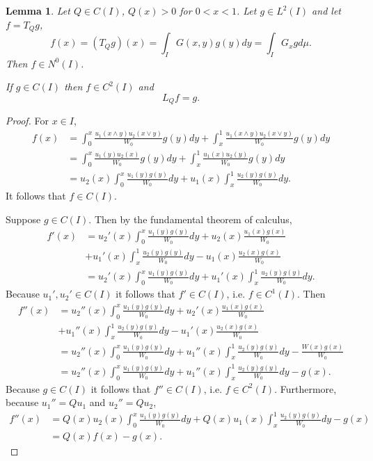 \documentclass{article}
\newtheorem{lemma}[theorem]{Lemma}
\theoremstyle{definition}
\begin{document}
\begin{lemma}
Let $Q \in C(I)$, $Q(x)>0$ for $0<x<1$. 
Let $g \in L^2(I)$ and let $f=T_Qg$,
\[
f(x)=(T_Qg)(x)=\int_I G(x,y) g(y) dy
=\int_I G_x g d\mu.
\]
Then $f \in N^0(I)$.  

If $g \in C(I)$ then $f \in C^2(I)$ and
\[
L_Q f=g.
\]
\label{proposition328}
\end{lemma}
\begin{proof}
For $x \in I$,
\begin{align*}
f(x)&=\int_0^x  \frac{u_1(x \wedge y) u_2(x \vee y)}{W_0} g(y) dy
+\int_x^1  \frac{u_1(x \wedge y) u_2(x \vee y)}{W_0} g(y) dy\\
&=\int_0^x \frac{u_1(y)u_2(x)}{W_0} g(y) dy
+\int_x^1 \frac{u_1(x)u_2(y)}{W_0}g(y) dy\\
&=u_2(x)\int_0^x \frac{u_1(y)g(y)}{W_0} dy
+u_1(x) \int_x^1 \frac{u_2(y) g(y)}{W_0} dy.
\end{align*}
It follows that $f \in C(I)$.

Suppose $g \in C(I)$. Then by the fundamental theorem of calculus,
\begin{align*}
f'(x)&=u_2'(x)\int_0^x \frac{u_1(y)g(y)}{W_0} dy
+u_2(x) \frac{u_1(x) g(x)}{W_0}\\
&+u_1'(x) \int_x^1 \frac{u_2(y) g(y)}{W_0} dy
-u_1(x) \frac{u_2(x)g(x)}{W_0}\\
&=u_2'(x)\int_0^x \frac{u_1(y)g(y)}{W_0} dy+u_1'(x) \int_x^1 \frac{u_2(y) g(y)}{W_0} dy.
\end{align*}
Because $u_1',u_2' \in C(I)$ it follows that $f' \in C(I)$, i.e. $f \in C^1(I)$.
Then
\begin{align*}
f''(x)&=u_2''(x)\int_0^x \frac{u_1(y)g(y)}{W_0} dy+u_2'(x) \frac{u_1(x)g(x)}{W_0}\\
&+u_1''(x)\int_x^1  \frac{u_2(y) g(y)}{W_0} dy
-u_1'(x) \frac{u_2(x)g(x)}{W_0}\\
&=u_2''(x)\int_0^x \frac{u_1(y)g(y)}{W_0} dy+u_1''(x)\int_x^1  \frac{u_2(y) g(y)}{W_0} dy-\frac{W(x)g(x)}{W_0}\\
&=u_2''(x)\int_0^x \frac{u_1(y)g(y)}{W_0} dy+u_1''(x)\int_x^1  \frac{u_2(y) g(y)}{W_0} dy-g(x).
\end{align*}
Because $g \in C(I)$ it follows that $f'' \in C(I)$, i.e. $f \in C^2(I)$. Furthermore,
because $u_1''=Qu_1$ and $u_2''=Qu_2$,
\begin{align*}
f''(x) &= Q(x)u_2(x)\int_0^x \frac{u_1(y)g(y)}{W_0} dy+Q(x)u_1(x)\int_x^1  \frac{u_2(y) g(y)}{W_0} dy-g(x)\\
&=Q(x)f(x)-g(x).
\end{align*}
\end{proof}
\end{document}
